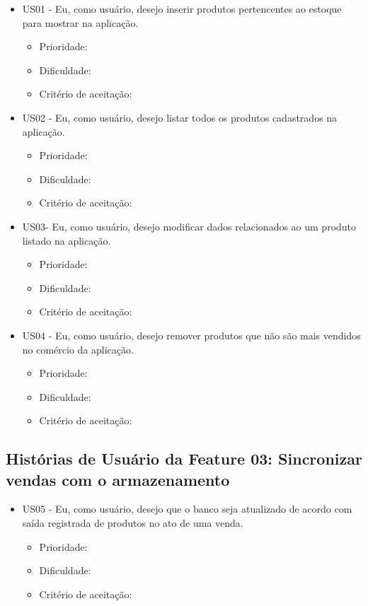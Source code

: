 \begin{itemize}
\item US01 - Eu, como usuário, desejo inserir produtos pertencentes ao estoque para mostrar na aplicação.
    \begin{itemize}
    \item Prioridade:
    \item Dificuldade:
    \item Critério de aceitação:
    \end{itemize}

\item US02 - Eu, como usuário, desejo listar todos os produtos cadastrados na aplicação.
    \begin{itemize}
    \item Prioridade:
    \item Dificuldade:
    \item Critério de aceitação:
    \end{itemize}


\item US03- Eu, como usuário, desejo modificar dados relacionados ao um produto listado na aplicação.
    \begin{itemize}
    \item Prioridade:
    \item Dificuldade:
    \item Critério de aceitação:
    \end{itemize}


\item US04 - Eu, como usuário, desejo remover produtos que não são mais vendidos no comércio da aplicação.
    \begin{itemize}
    \item Prioridade:
    \item Dificuldade:
    \item Critério de aceitação:
    \end{itemize}


\end{itemize}

\subsection{Histórias de Usuário da Feature 03: Sincronizar vendas com o armazenamento}

\begin{itemize}

\item US05 - Eu, como usuário, desejo que o banco seja atualizado de acordo com saída registrada de produtos no ato de uma venda.
    \begin{itemize}
    \item Prioridade:
    \item Dificuldade:
    \item Critério de aceitação:
    \end{itemize}


\end{itemize}

